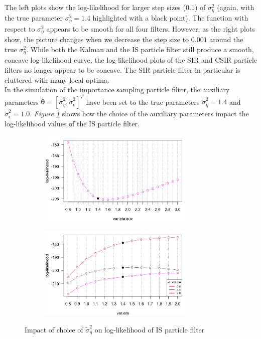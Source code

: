\documentclass[11pt, oneside]{scrreprt}   	%
\begin{document}
The left plots show the log-likelihood for larger step sizes ($0.1$) of $\sigma_{\eta}^2$ (again, with the true parameter $\sigma_{\eta}^2 = 1.4$ highlighted with a black point). The function with respect to $\sigma_{\eta}^2$ appears to be smooth for all four filters. However, as the right plots show, the picture changes when we decrease the step size to $0.001$ around the true $\sigma_{\eta}^2$. While both the Kalman and the IS particle filter still produce a smooth, concave log-likelihood curve, the log-likelihood plots of the SIR and CSIR particle filters no longer appear to be concave. The SIR particle filter in particular is cluttered with many local optima.\\

In the simulation of the importance sampling particle filter, the auxiliary parameters $\boldsymbol{\tilde{\theta}}=[\tilde{\sigma}_{\eta}^2, \tilde{\sigma}_{\epsilon}^2]^T$ have been set to the true parameters $\tilde{\sigma}_{\eta}^2=1.4$ and $\tilde{\sigma}_{\epsilon}^2=1.0$. \textit{Figure \ref{fig:ullm_theta_aux}} shows how the choice of the auxiliary parameters impact the log-likelihood values of the IS particle filter. \\

\begin{figure}[h!]
\centering
\begin{subfigure}{0.5\textwidth}
  \centering
  \includegraphics[width=75mm]{../../images/ullm-loglik-aux-eta.png}
\end{subfigure}%
\begin{subfigure}{0.5\textwidth}
  \centering
  \includegraphics[width=75mm]{../../images/ullm-loglik-aux-eta-2.png}
\end{subfigure}
\caption{Impact of choice of $\tilde{\sigma}_{\eta}^2$ on log-likelihood of IS particle filter}
\label{fig:ullm_theta_aux}
\end{figure}
\end{document}
